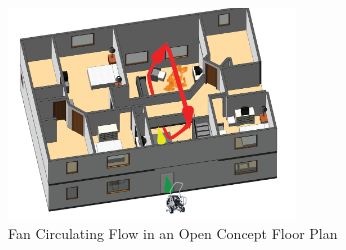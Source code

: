 \documentclass{article}
\begin{document}
\begin{figure}[H]
	\centering
	\includegraphics[width = 3in]{0_Images/Tactical_Considerations/Compartmentalization/CirculatingFlow.png} 
	\caption{Fan Circulating Flow in an Open Concept Floor Plan}
	\label{fig:FlowCirculation}
\end{figure}
\end{document}
